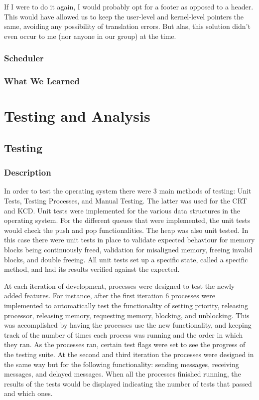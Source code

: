 \documentclass[12pt,twocolumn]{report}
\begin{document}
If I were to do it again, I would probably opt for a footer as opposed to a
header. This would have allowed us to keep the user-level and kernel-level
pointers the same, avoiding any possibility of translation errors. But alas,
this solution didn't even occur to me (nor anyone in our group) at the time.
\section{Scheduler}

\section{What We Learned}

\part{Testing and Analysis}

\chapter{Testing}

\section{Description}

In order to test the operating system there were 3 main methods of testing: Unit Tests, Testing Processes, and Manual Testing. The latter was used for the CRT and KCD. Unit tests were implemented for the various data structures in the operating system. For the different queues that were implemented, the unit tests would check the push and pop functionalities. The heap was also unit tested. In this case there were unit tests in place to validate expected behaviour for memory blocks being continuously freed, validation for misaligned memory, freeing invalid blocks, and double freeing. All unit tests set up a specific state, called a specific method, and had its results verified against the expected.

At each iteration of development, processes were designed to test the newly added features. For instance, after the first iteration 6 processes were implemented to automatically test the functionality of setting priority, releasing processor, releasing memory, requesting memory, blocking, and unblocking. This was accomplished by having the processes use the new functionality, and keeping track of the number of times each process was running and the order in which they ran. As the processes ran, certain test flags were set to see the progress of the testing suite. At the second and third iteration the processes were designed in the same way but for the following functionality: sending messages, receiving messages, and delayed messages.  When all the processes finished running, the results of the tests would be displayed indicating the number of tests that passed and which ones.
\end{document}
